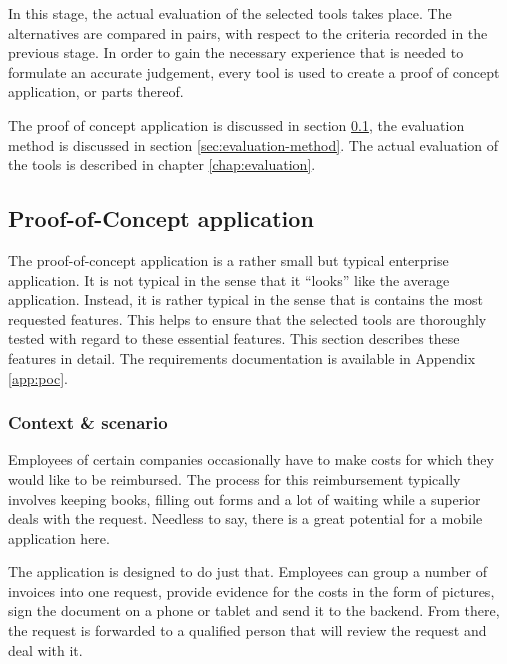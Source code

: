 
In this stage, the actual evaluation of the selected tools takes place. The alternatives are compared in pairs, with respect to the criteria recorded in the previous stage. In order to gain the necessary experience that is needed to formulate an accurate judgement, every tool is used to create a proof of concept application, or parts thereof.

The proof of concept application is discussed in section \ref{sec:poc}, the evaluation method is discussed in section \ref{sec:evaluation-method}. The actual evaluation of the tools is described in chapter \ref{chap:evaluation}.

\subsection{Proof-of-Concept application}
\label{sec:poc}

The proof-of-concept application is a rather small but typical enterprise application. It is not typical in the sense that it ``looks'' like the average application. Instead, it is rather typical in the sense that is contains the most requested features. This helps to ensure that the selected tools are thoroughly tested with regard to these essential features. This section describes these features in detail. The requirements documentation is available in Appendix \ref{app:poc}.

\subsubsection{Context \& scenario}

Employees of certain companies occasionally have to make costs for which they would like to be reimbursed. The process for this reimbursement typically involves keeping books, filling out forms and a lot of waiting while a superior deals with the request. Needless to say, there is a great potential for a mobile application here.

The application is designed to do just that. Employees can group a number of invoices into one request, provide evidence for the costs in the form of pictures, sign the document on a phone or tablet and send it to the backend. From there, the request is forwarded to a qualified person that will review the request and deal with it. 

